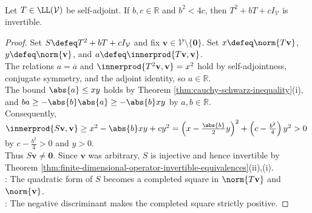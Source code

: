 \begin{proposition} \label{prop:invertible-quadratic-self-adjoint} \\
Let $T\in\LL(\mathcal{V})$ be self-adjoint. If $b,c\in\mathbb{R}$ and $b^2<4c$, then $T^2+bT+cI_{\mathcal{V}}$ is invertible.
\begin{proof}
Set $S\defeq T^2+bT+cI_{\mathcal{V}}$ and fix $\mathbf{v}\in\mathcal{V}\setminus\{\mathbf{0}\}$. Set $x\defeq\norm{T\mathbf{v}}$, $y\defeq\norm{\mathbf{v}}$, and $a\defeq\innerprod{T\mathbf{v},\mathbf{v}}$.\\
The relations $a=\overline{a}$ and $\innerprod{T^2\mathbf{v},\mathbf{v}}=x^2$ hold by self-adjointness, conjugate symmetry, and the adjoint identity, so $a\in\mathbb{R}$.\\
The bound $\abs{a}\leq xy$ holds by Theorem \ref{thm:cauchy-schwarz-inequality}(i), and $ba\geq-\abs{b}\abs{a}\geq-\abs{b}xy$ by $a,b\in\mathbb{R}$.\\
Consequently, $\innerprod{S\mathbf{v},\mathbf{v}}\geq x^2-\abs{b}xy+cy^2=\left(x-\frac{\abs{b}}{2}y\right)^2+\left(c-\frac{b^2}{4}\right)y^2>0$ by $c-\frac{b^2}{4}>0$ and $y>0$.\\
Thus $S\mathbf{v}\neq\mathbf{0}$. Since $\mathbf{v}$ was arbitrary, $S$ is injective and hence invertible by Theorem \ref{thm:finite-dimensional-operator-invertible-equivalences}(ii),(i).\\
: The quadratic form of $S$ becomes a completed square in $\norm{T\mathbf{v}}$ and $\norm{\mathbf{v}}$.\\
: The negative discriminant makes the completed square strictly positive.
\end{proof}
\end{proposition}

